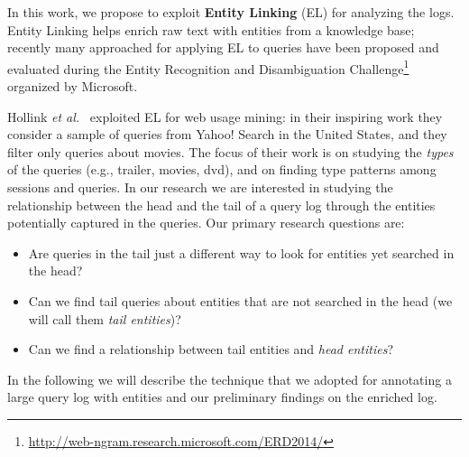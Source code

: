 
In this work, we propose
to exploit \textbf{Entity Linking} (EL) for analyzing the logs. Entity Linking helps enrich raw text with entities 
from a knowledge base; recently many approached for applying 
EL to queries have been proposed and evaluated during the Entity Recognition and Disambiguation Challenge\footnote{
\url{http://web-ngram.research.microsoft.com/ERD2014/}} organized by Microsoft. 

Hollink \emph{et al.}~\cite{hollink2013web} exploited EL for web usage mining: 
in their inspiring work they consider a sample of 
queries from Yahoo! Search in the United States, and they filter only queries about movies. The focus
of their work is on studying the \emph{types} of the queries (e.g., trailer, movies, dvd), and on finding
type patterns among sessions and queries. In our research we are interested in studying the 
relationship between the head and the tail of a query log
through the entities potentially captured in the queries. Our primary research questions are:
\begin{itemize}
	\item Are queries in the tail just a different way to look for entities yet searched in the head? 
	\item Can we find tail queries about entities that are not searched in the head (we will call them \emph{tail entities})?
	\item Can we find a relationship between tail entities and \emph{head entities}?  
\end{itemize} 

In the following we will describe the technique that we adopted for annotating a large query log with entities 
and our preliminary findings on the enriched log.


 
